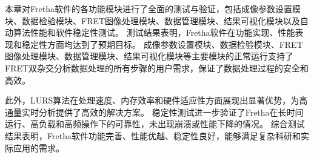 本章对Fretha软件的各功能模块进行了全面的测试与验证，包括成像参数设置模块、数据检验模块、FRET图像处理模块、数据管理模块、结果可视化模块以及自动算法性能和软件稳定性测试。
测试结果表明，Fretha软件在功能实现、性能表现和稳定性方面均达到了预期目标。
成像参数设置模块、数据检验模块、FRET图像处理模块、数据管理模块、结果可视化模块等主要模块的正常运行支持了FRET双杂交分析数据处理的所有步骤的用户需求，保证了数据处理过程的安全和高效。

此外，LURS算法在处理速度、内存效率和硬件适应性方面展现出显著优势，为高通量实时分析提供了高效的解决方案。
稳定性测试进一步验证了Fretha在长时间运行、高负载和高频操作下的可靠性，未出现崩溃或性能下降的情况。
综合测试结果表明，Fretha软件功能完善、性能优越、稳定性良好，能够满足复杂科研和实际应用的需求。